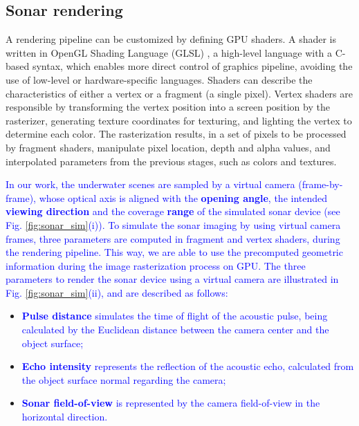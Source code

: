 \documentclass[final,5p,times]{elsarticle}
\begin{document}
\subsection{Sonar rendering}
\label{dev:shader}

A rendering pipeline can be customized by defining GPU shaders. A shader is written in OpenGL Shading Language (GLSL) \cite{rost2009}, a high-level language with a C-based syntax, which enables more direct control of graphics pipeline, avoiding the use of low-level or hardware-specific languages. Shaders can describe the characteristics of either a vertex or a fragment (a single pixel). Vertex shaders are responsible by transforming the vertex position into a screen position by the rasterizer, generating texture coordinates for texturing, and lighting the vertex to determine each color. The rasterization results, in a set of pixels to be processed by fragment shaders, manipulate pixel location, depth and alpha values, and interpolated parameters from the previous stages, such as colors and textures.

\textcolor{blue}{In our work, the underwater scenes are sampled by a virtual camera (frame-by-frame), whose optical axis is aligned with the \textbf{opening angle}, the intended \textbf{viewing direction} and the coverage \textbf{range} of the simulated sonar device (see Fig. \ref{fig:sonar_sim}(i)). To simulate the sonar imaging by using virtual camera frames, three parameters are computed in fragment and vertex shaders, during the rendering pipeline. This way, we are able to use the precomputed geometric information during the image rasterization process on GPU. The three parameters to render the sonar device using a virtual camera are illustrated in Fig. \ref{fig:sonar_sim}(ii), and are described as follows:}

\begin{itemize}[]
    \item \textcolor{blue}{\textbf{Pulse distance} simulates the time of flight of the acoustic pulse, being calculated by the Euclidean distance between the camera center and the object surface;}
    \item \textcolor{blue}{\textbf{Echo intensity} represents the reflection of the acoustic echo, calculated from the object surface normal regarding the camera;}
    \item \textcolor{blue}{\textbf{Sonar field-of-view} is represented by the camera field-of-view in the horizontal direction.}
\end{itemize}
\end{document}
